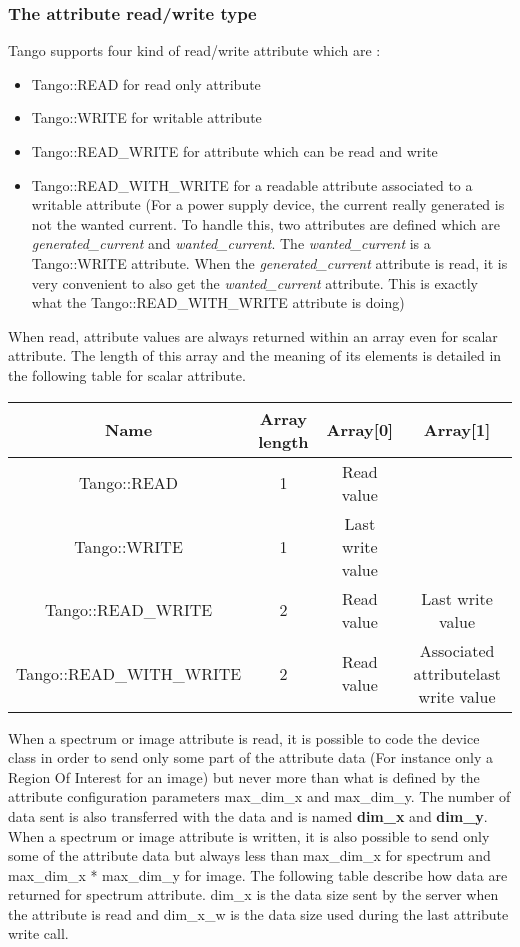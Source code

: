\subsubsection{The attribute read/write type}

Tango supports four kind of read/write attribute which are :
\begin{itemize}
\item Tango::READ for read only attribute
\item Tango::WRITE for writable attribute
\item Tango::READ\_WRITE for attribute which can be read
and write
\item Tango::READ\_WITH\_WRITE for a readable attribute
associated to a writable attribute (For a power supply device, the
current really generated is not the wanted current. To handle this,
two attributes are defined which are \emph{generated\_current} and
\emph{wanted\_current}. The \emph{wanted\_current} is a Tango::WRITE
attribute. When the \emph{generated\_current} attribute is read, it
is very convenient to also get the \emph{wanted\_current} attribute.
This is exactly what the Tango::READ\_WITH\_WRITE attribute is doing)
\end{itemize}
When read, attribute values are always returned within an array even
for scalar attribute. The length of this array and the meaning of
its elements is detailed in the following table for scalar attribute.

\vspace{0.3cm}

\begin{center}
\begin{longtable}{|c|c|c|c|}
\hline 
Name & Array length & Array{[}0{]} & Array{[}1{]}\tabularnewline
\hline 
\hline 
Tango::READ & 1 & Read value & \tabularnewline
\hline 
Tango::WRITE & 1 & Last write value & \tabularnewline
\hline 
Tango::READ\_WRITE & 2 & Read value & Last write value\tabularnewline
\hline 
Tango::READ\_WITH\_WRITE  & 2 & Read value & Associated attributelast write value\tabularnewline
\hline 
\end{longtable}
\par\end{center}

\vspace{0.3cm}

When a spectrum or image attribute is read, it is possible to code
the device class in order to send only some part of the attribute
data (For instance only a Region Of Interest for an image) but never
more than what is defined by the attribute configuration parameters
max\_dim\_x and max\_dim\_y. The number of data sent is also transferred
with the data and is named \textbf{dim\_x} and \textbf{dim\_y}.
When a spectrum or image attribute is written, it is also possible
to send only some of the attribute data but always less than max\_dim\_x
for spectrum and max\_dim\_x {*} max\_dim\_y for image. The following
table describe how data are returned for spectrum attribute. dim\_x
is the data size sent by the server when the attribute is read and
dim\_x\_w is the data size used during the last attribute write call.

